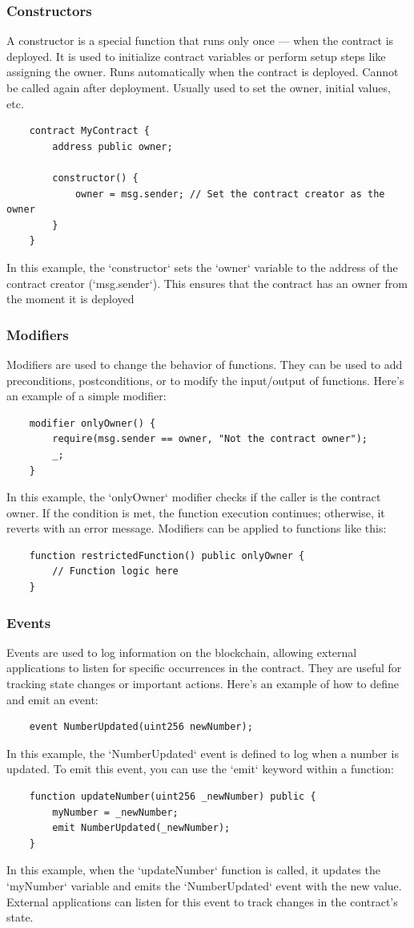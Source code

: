 \documentclass[12pt, a4paper]{article}
\begin{document}
\subsubsection{Constructors}
A constructor is a special function that runs only once — when the contract is deployed. It is used to initialize contract variables or perform setup steps like assigning the owner. Runs automatically when the contract is deployed. Cannot be called again after deployment. Usually used to set the owner, initial values, etc.
\begin{verbatim}
    contract MyContract {
        address public owner;

        constructor() {
            owner = msg.sender; // Set the contract creator as the owner
        }
    }
\end{verbatim}
In this example, the `constructor` sets the `owner` variable to the address of the contract creator (`msg.sender`). This ensures that the contract has an owner from the moment it is deployed
\subsubsection{Modifiers}
Modifiers are used to change the behavior of functions. They can be used to add preconditions, postconditions, or to modify the input/output of functions. Here’s an example of a simple modifier:
\begin{verbatim}
    modifier onlyOwner() {
        require(msg.sender == owner, "Not the contract owner");
        _;
    }
\end{verbatim}
In this example, the `onlyOwner` modifier checks if the caller is the contract owner. If the condition is met, the function execution continues; otherwise, it reverts with an error message. Modifiers can be applied to functions like this:
\begin{verbatim}
    function restrictedFunction() public onlyOwner {
        // Function logic here
    }
\end{verbatim}
\subsubsection{Events}
Events are used to log information on the blockchain, allowing external applications to listen for specific occurrences in
the contract. They are useful for tracking state changes or important actions. Here’s an example of how to define and emit an event:
\begin{verbatim}
    event NumberUpdated(uint256 newNumber);
\end{verbatim}
In this example, the `NumberUpdated` event is defined to log when a number is updated. To emit this event, you can use the `emit` keyword within a function:
\begin{verbatim}
    function updateNumber(uint256 _newNumber) public {
        myNumber = _newNumber;
        emit NumberUpdated(_newNumber);
    }
\end{verbatim}
In this example, when the `updateNumber` function is called, it updates the `myNumber` variable and emits the `NumberUpdated` event with the new value. External applications can listen for this event to track changes in the contract's state.
\end{document}
